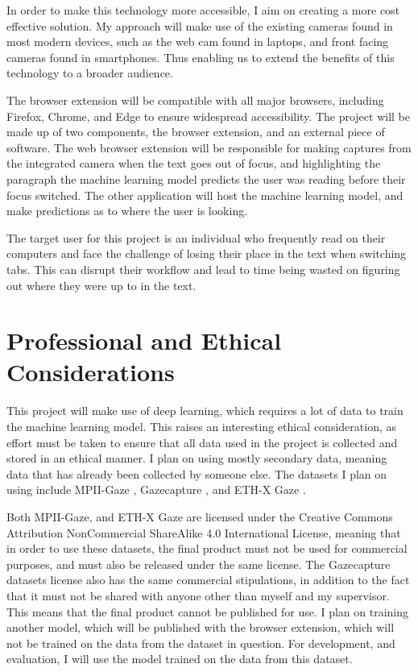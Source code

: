 \documentclass[twocolumn]{report}
\begin{document}
In order to make this technology more accessible, I aim on creating a more cost effective solution. My approach will make use of the existing cameras found in most modern devices, such as the web cam found in laptops, and front facing cameras found in smartphones. Thus enabling us to extend the benefits of this technology to a broader audience. 

The browser extension will be compatible with all major browsers, including Firefox, Chrome, and Edge to ensure widespread accessibility. The project will be made up of two components, the browser extension, and an external piece of software. The web browser extension will be responsible for making captures from the integrated camera when the text goes out of focus, and highlighting the paragraph the machine learning model predicts the user was reading before their focus switched. The other application will host the machine learning model, and make predictions as to where the user is looking.

The target user for this project is an individual who frequently read on their computers and face the challenge of losing their place in the text when switching tabs. This can disrupt their workflow and lead to time being wasted on figuring out where they were up to in the text. 

\chapter{Professional and Ethical Considerations}

This project will make use of deep learning, which requires a lot of data to train the machine learning model. This raises an interesting ethical consideration, as effort must be taken to ensure that all data used in the project is collected and stored in an ethical manner. I plan on using mostly secondary data, meaning data that has already been collected by someone else. The datasets I plan on using include MPII-Gaze \cite{cheng2021survey}, Gazecapture \cite{krafka2016eye}, and ETH-X Gaze \cite{zhang2020ethxgaze}. 

Both MPII-Gaze, and ETH-X Gaze are licensed under the Creative Commons Attribution NonCommercial ShareAlike 4.0 International License, meaning that in order to use these datasets, the final product must not be used for commercial purposes, and must also be released under the same license. The Gazecapture datasets license also has the same commercial stipulations, in addition to the fact that it must not be shared with anyone other than myself and my supervisor. This means that the final product cannot be published for use. I plan on training another model, which will be published with the browser extension, which will not be trained on the data from the dataset in question. For development, and evaluation, I will use the model trained on the data from this dataset. 
\end{document}
